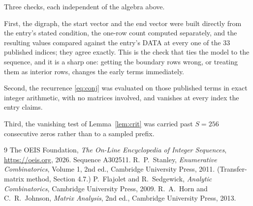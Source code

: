 \documentclass[11pt,a4paper]{article}
\theoremstyle{plain}
\theoremstyle{definition}
\begin{document}
Three checks, each independent of the algebra above.

First, the digraph, the start vector and the end vector were built directly from the
entry's stated condition, the one-row count computed separately, and the resulting values
compared against the entry's DATA at every one of the $33$ published indices; they
agree exactly. This is the check that ties the model to the sequence, and it is a sharp one:
getting the boundary rows wrong, or treating them as interior rows, changes the early terms
immediately.

Second, the recurrence \eqref{eq:conj} was evaluated on those published terms in exact
integer arithmetic, with no matrices involved, and vanishes at every index the entry claims.

Third, the vanishing test of Lemma~\ref{lem:crit} was carried past $S=256$ consecutive
zeros rather than to a sampled prefix.

\begin{thebibliography}{9}
 The OEIS Foundation, \emph{The On-Line Encyclopedia of Integer
Sequences}, \url{https://oeis.org}, 2026. Sequence A302511.
 R.~P.~Stanley, \emph{Enumerative Combinatorics}, Volume 1, 2nd ed.,
Cambridge University Press, 2011. (Transfer-matrix method, Section 4.7.)
 P.~Flajolet and R.~Sedgewick, \emph{Analytic Combinatorics}, Cambridge
University Press, 2009.
 R.~A.~Horn and C.~R.~Johnson, \emph{Matrix Analysis}, 2nd ed., Cambridge
University Press, 2013.
\end{thebibliography}
\end{document}
